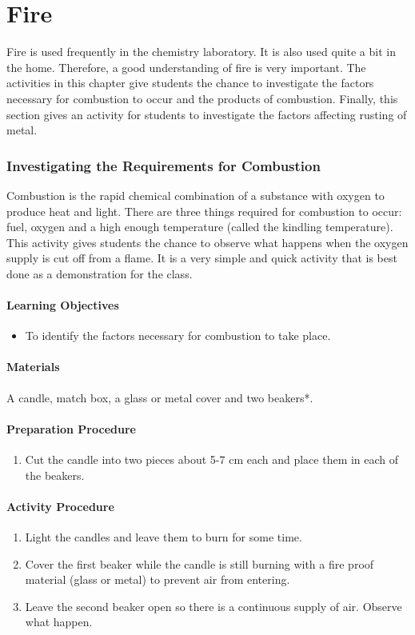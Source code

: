\chapter{Fire}
Fire is used frequently in the chemistry laboratory. It is also used quite a bit in the home. Therefore, a good understanding of fire is very important.
The activities in this chapter give students the chance to investigate the factors necessary for combustion to occur and the products of combustion. Finally, this section gives an activity for students to investigate the factors affecting rusting of metal.

\subsection{Investigating the Requirements for Combustion}
Combustion is the rapid chemical combination of a substance with oxygen to produce heat and light. There are three things required for combustion to occur: fuel, oxygen and a high enough temperature (called the kindling temperature). This activity gives students the chance to observe what happens when the oxygen supply is cut off from a flame. It is a very simple and quick activity that is best done as a demonstration for the class.
\subsubsection*{Learning Objectives}
\begin{itemize}
\item{To identify the factors necessary for combustion to take place.}
\end{itemize}

\subsubsection*{Materials}
A candle, match box, a glass or metal cover and two beakers*.

\subsubsection*{Preparation Procedure}
\begin{enumerate}
\item{Cut the candle into two pieces about 5-7 cm each and place them in each of the beakers.}
\end{enumerate}

\subsubsection*{Activity Procedure}
\begin{enumerate}
\item{Light the candles and leave them to burn for some time.}
\item{Cover the first beaker while the candle is still burning with a fire proof material (glass or metal) to prevent air from entering.}
\item{Leave the second beaker open so there is a continuous supply of air. Observe what happen.}
\end{enumerate}


